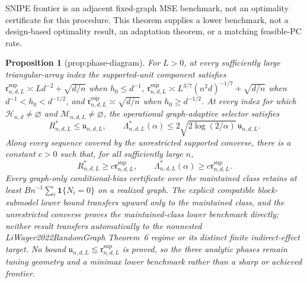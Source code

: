 \documentclass{article}
\newtheorem{proposition}{Proposition}
\begin{document}
SNIPE frontier is an adjacent fixed-graph MSE benchmark, not an optimality certificate for this procedure. This theorem supplies a lower benchmark, not a design-based optimality result, an adaptation theorem, or a matching feasible-PC rate.

\begin{proposition}[prop:phase-diagram]\label{prop:phase-diagram}
For \(L>0\), at every sufficiently large triangular-array index the supported-unit component satisfies \(\mathfrak r^{\mathrm{sup}}_{n,d,L}\asymp Ld^{-2}+\sqrt{d/n}\) when \(h_0\leq d^{-1}\), \(\mathfrak r^{\mathrm{sup}}_{n,d,L}\asymp L^{3/7}(n^2d)^{-1/7}+\sqrt{d/n}\) when \(d^{-1}<h_0<d^{-1/2}\), and \(\mathfrak r^{\mathrm{sup}}_{n,d,L}\asymp\sqrt{d/n}\) when \(h_0\geq d^{-1/2}\).  At every index for which \(\mathcal H_{n,d}\ne\varnothing\) and \(\mathcal M_{n,d,L}\ne\varnothing\), the operational graph-adaptive selector satisfies
\[
 R^*_{n,d,L}\leq\mathfrak u_{n,d,L},
 \qquad
 \Lambda^*_{n,d,L}(\alpha)
 \leq2\sqrt{2\log(2/\alpha)}\,\mathfrak u_{n,d,L}.
\]
Along every sequence covered by the unrestricted supported converse, there is a constant \(c>0\) such that, for all sufficiently large \(n\),
\[
 R^*_{n,d,L}\geq c\mathfrak r^{\mathrm{sup}}_{n,d,L},
 \qquad
 \Lambda^*_{n,d,L}(\alpha)\geq c\mathfrak r^{\mathrm{sup}}_{n,d,L}.
\]
Every graph-only conditional-bias certificate over the maintained class retains at least \(Bn^{-1}\sum_i\mathbf1\{N_i=0\}\) on a realized graph.  The explicit compatible block-submodel lower bound transfers upward only to the maintained class, and the unrestricted converse proves the maintained-class lower benchmark directly; neither result transfers automatically to the nonnested LiWager2022RandomGraph Theorem~6 regime or its distinct finite indirect-effect target.  No bound \(\mathfrak u_{n,d,L}\lesssim\mathfrak r^{\mathrm{sup}}_{n,d,L}\) is proved, so the three analytic phases remain tuning geometry and a minimax lower benchmark rather than a sharp or achieved frontier.
\end{proposition}
\end{document}
